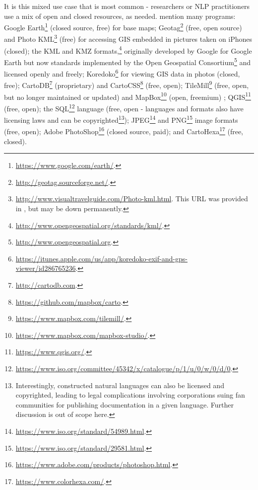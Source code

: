 It is this mixed use case that is most common - researchers or NLP practitioners use a mix of open and closed resources, as needed. \citet{gawne2016mapmaking} mention many programs: Google Earth\footnote{\href{https://www.google.com/earth/}{https://www.google.com/earth/}. } (closed source, free) for base maps; Geotag\footnote{\href{http://geotag.sourceforge.net/}{http://geotag.sourceforge.net/}. } (free, open source) and Photo KML\footnote{\href{http://www.visualtravelguide.com/Photo-kml.html}{http://www.visualtravelguide.com/Photo-kml.html}. This URL was provided in \citet{gawne2016mapmaking}, but may be down permanently.} (free) for accessing GIS embedded in pictures taken on iPhones (closed); the KML and KMZ formats,\footnote{\href{http://www.opengeospatial.org/standards/kml/}{http://www.opengeospatial.org/standards/kml/}. } originally developed by Google for Google Earth but now standards implemented by the Open Geospatial Consortium\footnote{\href{http://www.opengeospatial.org}{http://www.opengeospatial.org}. } and licensed openly and freely; Koredoko\footnote{\href{https://itunes.apple.com/us/app/koredoko-exif-and-gps-viewer/id286765236}{https://itunes.apple.com/us/app/koredoko-exif-and-gps-viewer/id286765236}. } for viewing GIS data in photos (closed, free); CartoDB\footnote{\href{http://cartodb.com}{http://cartodb.com}. } (proprietary) and CartoCSS\footnote{\href{https://github.com/mapbox/carto}{https://github.com/mapbox/carto}. } (free, open); TileMill\footnote{\href{https://www.mapbox.com/tilemill/}{https://www.mapbox.com/tilemill/}. } (free, open, but no longer maintained or updated) and MapBox\footnote{\href{https://www.mapbox.com/mapbox-studio/}{https://www.mapbox.com/mapbox-studio/}. } (open, freemium) ; QGIS\footnote{\href{https://www.qgis.org/}{https://www.qgis.org/}. } (free, open); the SQL\footnote{\href{https://www.iso.org/committee/45342/x/catalogue/p/1/u/0/w/0/d/0}{https://www.iso.org/committee/45342/x/catalogue/p/1/u/0/w/0/d/0}. } language (free, open - languages and formats also have licensing laws and can be copyrighted\footnote{Interestingly, constructed natural languages can also be licensed and copyrighted, leading to legal complications involving corporations suing fan communities for publishing documentation in a given language. Further discussion is out of scope here.}); JPEG\footnote{\href{https://www.iso.org/standard/54989.html}{https://www.iso.org/standard/54989.html}. } and PNG\footnote{\href{https://www.iso.org/standard/29581.html}{https://www.iso.org/standard/29581.html}. } image formats (free, open); Adobe PhotoShop\footnote{\href{https://www.adobe.com/products/photoshop.html}{https://www.adobe.com/products/photoshop.html}. } (closed source, paid); and CartoHexa\footnote{\href{https://www.colorhexa.com/}{https://www.colorhexa.com/}. } (free, closed).

